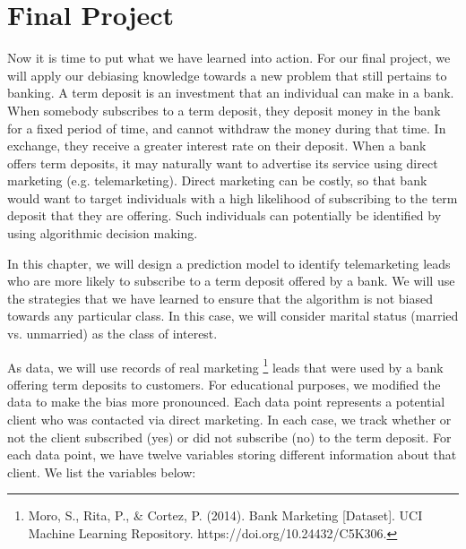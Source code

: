 \section{Final Project}


\par Now it is time to put what we have learned into action. For our final project, we will apply our debiasing knowledge towards a new problem that still pertains to banking. A term deposit is an investment that an individual can make in a bank. When somebody subscribes to a term deposit, they deposit money in the bank for a fixed period of time, and cannot withdraw the money during that time. In exchange, they receive a greater interest rate on their deposit. When a bank offers term deposits, it may naturally want to advertise its service using direct marketing (e.g. telemarketing). Direct marketing can be costly, so that bank would want to target individuals with a high likelihood of subscribing to the term deposit that they are offering. Such individuals can potentially be identified by using algorithmic decision making.

\par In this chapter, we will design a prediction model to identify telemarketing leads who are more likely to subscribe to a term deposit offered by a bank. We will use the strategies that we have learned to ensure that the algorithm is not biased towards any particular class. In this case, we will consider marital status (married vs. unmarried) as the class of interest. 

\par As data, we will use records of real marketing \footnote{Moro, S., Rita, P., & Cortez, P. (2014). Bank Marketing [Dataset]. UCI Machine Learning Repository. https://doi.org/10.24432/C5K306.} leads that were used by a bank offering term deposits to customers. For educational purposes, we modified the data to make the bias more pronounced. Each data point represents a potential client who was contacted via direct marketing. In each case, we track whether or not the client subscribed (yes) or did not subscribe (no) to the term deposit. For each data point, we have twelve variables storing different information about that client. We list the variables below:


